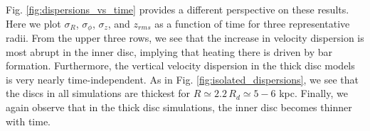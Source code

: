 {Fig. \ref{fig:dispersions_vs_time} provides a different perspective on these results. Here we
plot $\sigma_R$, $\sigma_\phi$, $\sigma_z$, and $z_{rms}$ as a function of time for three representative
radii.
From the upper three rows, we see that the increase in velocity dispersion
is most abrupt in the inner disc, implying that heating there is
driven by bar formation. Furthermore, the vertical velocity dispersion
in the thick disc models is very nearly time-independent.
As in Fig. \ref{fig:isolated_dispersions}, we see that the discs in all simulations are thickest
for $R \simeq 2.2\,R_d \simeq 5-6$ kpc. Finally, we again observe that
in the thick disc simulations, the inner disc becomes thinner with time.}






